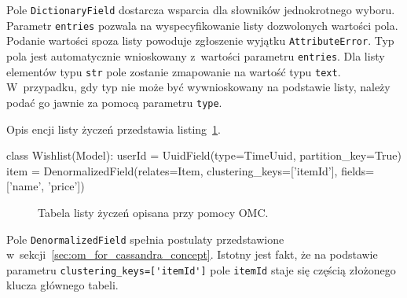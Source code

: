 Pole \verb+DictionaryField+ dostarcza wsparcia dla słowników jednokrotnego wyboru. Parametr \verb+entries+ pozwala na wyspecyfikowanie listy dozwolonych wartości pola. Podanie wartości spoza listy powoduje zgłoszenie wyjątku \verb+AttributeError+. Typ pola jest automatycznie wnioskowany z~wartości parametru \verb+entries+. Dla listy elementów typu \verb+str+ pole zostanie zmapowanie na wartość typu \verb+text+. W~przypadku, gdy typ nie może być wywnioskowany na podstawie listy, należy podać go jawnie za pomocą parametru \verb+type+.

Opis encji listy życzeń przedstawia listing~\ref{lst:omc_wishlist_definition}.

\begin{verbbox}
class Wishlist(Model):
    userId = UuidField(type=TimeUuid, partition_key=True)
    item = DenormalizedField(relates=Item, 
                             clustering_keys=['itemId'], 
                             fields=['name', 'price'])
\end{verbbox}

\begin{figure}[ht!]
	\centering
	\theverbbox
	\caption{Tabela listy życzeń opisana przy pomocy OMC.}
	\label{lst:omc_wishlist_definition}
\end{figure}

Pole \verb+DenormalizedField+ spełnia postulaty przedstawione w~sekcji~\ref{sec:om_for_cassandra_concept}. Istotny jest fakt, że na podstawie parametru \verb+clustering_keys=['itemId']+ pole \verb+itemId+ staje się częścią złożonego klucza głównego tabeli.
